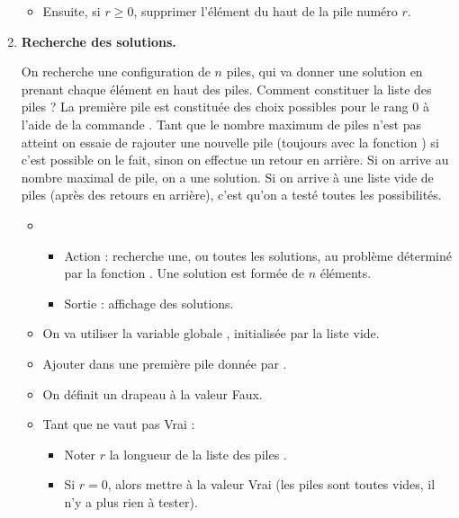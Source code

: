 \documentclass[11pt,class=report,crop=false]{standalone}
\begin{document}
\begin{activite}
\begin{enumerate}
\begin{algorithme}
\begin{itemize}
     
   \item Ensuite, si $r\ge0$, supprimer l'élément du haut de la pile numéro $r$.
   
 \end{itemize}  
 \end{algorithme}
 
 
 
 \item \textbf{Recherche des solutions.}
  
On recherche une configuration de $n$ piles, qui va donner une solution en prenant chaque élément en haut des piles. Comment constituer la liste des piles ?
La première pile est constituée des choix possibles pour le rang $0$ à l'aide de la commande .
Tant que le nombre maximum de piles n'est pas atteint on essaie de rajouter une nouvelle pile (toujours avec la fonction ) si c'est possible on le fait, sinon on effectue un retour en arrière. 
Si on arrive au nombre maximal de pile, on a une solution. 
Si on arrive à une liste vide de piles (après des retours en arrière), c'est qu'on a testé toutes les possibilités.
   
  
  \begin{algorithme}
  \sauteligne 
  \begin{itemize}
   \item
   \begin{itemize}
     \item Action : recherche une, ou toutes les solutions, au problème déterminé par la fonction . Une solution est formée de $n$ éléments.  
     \item Sortie : affichage des solutions.

   \end{itemize}

  \item On va utiliser la variable globale , initialisée 
  par la liste vide.
  
  \item Ajouter dans  une première pile donnée par .
  
  \item On définit un drapeau  à la valeur \og{}Faux\fg{}.
  
  \item Tant que  ne vaut pas \og{}Vrai\fg{} :
  
   \begin{itemize}
     \item Noter $r$ la longueur de la liste des piles .
     \item Si $r=0$, alors mettre  à la valeur \og{}Vrai\fg{} (les piles sont toutes vides, il n'y a plus rien à tester).


\end{itemize}
\end{itemize}
\end{algorithme}
\end{enumerate}
\end{activite}
\end{document}
